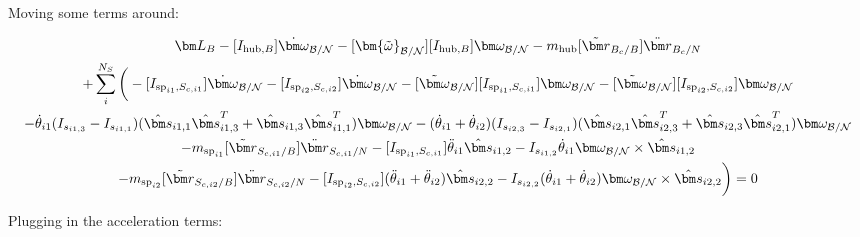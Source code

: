 Moving some terms around:

\begin{multline}
	\bm L_B -[I_{\text{hub},B}] \dot{\bm\omega}_{\cal B/N}  -[\bm{\tilde{\omega}}_{\cal B/N}] [I_{\text{hub},B}] \bm\omega_{\cal B/N} - m_{\text{hub}} [\tilde{{\bm r}}_{B_c/B}] \ddot{\bm r}_{B_c/N} \\
	+ \sum\limits_{i}^{N_S}\bigg(-[I_{\text{sp}_{i1},S_{c,i1}}] \dot{\bm \omega}_{\cal{B/N}} -[I_{\text{sp}_{i2},S_{c,i2}}] \dot{\bm \omega}_{\cal{B/N}} -[\tilde{\bm \omega}_{\cal{B/N}}] [I_{\text{sp}_{i1},S_{c,i1}}] \bm \omega_{\cal{B/N}}-[\tilde{\bm \omega}_{\cal{B/N}}] [I_{\text{sp}_{i2},S_{c,i2}}] \bm \omega_{\cal{B/N}}\\
	-\dot{\theta}_{i1} (I_{s_{i1,3}} - I_{s_{i1,1}})( \hat{\bm s}_{i1,1} \hat{\bm s}_{i1,3}^T + \hat{\bm s}_{i1,3} \hat{\bm s}_{i1,1}^T) \bm \omega_{\cal{B/N}} -(\dot{\theta}_{i1}  + \dot{\theta}_{i2})(I_{s_{i2,3}} - I_{s_{i2,1}}) (\hat{\bm s}_{i2,1} \hat{\bm s}_{i2,3}^T + \hat{\bm s}_{i2,3} \hat{\bm s}_{i2,1}^T) \bm \omega_{\cal{B/N}} \\
	- m_{\text{sp}_{i1}} [\tilde{{\bm r}}_{S_{c,i1}/B}] \ddot{\bm r}_{S_{c,i1}/N} -[I_{\text{sp}_{i1},S_{c,i1}}] \ddot{\theta}_{i1} \hat{\bm s}_{i1,2}
	-I_{s_{i1,2}} \dot{\theta}_{i1} \bm \omega_{\cal{B/N}} \times \hat{\bm s}_{i1,2}\\
	- m_{\text{sp}_{i2}} [\tilde{{\bm r}}_{S_{c,i2}/B}] \ddot{\bm r}_{S_{c,i2}/N} -[I_{\text{sp}_{i2},S_{c,i2}}] (\ddot{\theta}_{i1}  + \ddot{\theta}_{i2})\hat{\bm s}_{i2,2}
	-I_{s_{i2,2}}  (\dot{\theta}_{i1}  + \dot{\theta}_{i2}) \bm \omega_{\cal{B/N}} \times \hat{\bm s}_{i2,2} \bigg) = 0
\end{multline}

Plugging in the acceleration terms:


